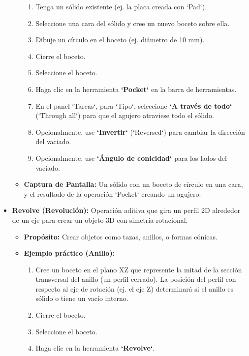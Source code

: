 \documentclass[12pt]{article}
\begin{document}
\begin{itemize}[label=\textbullet]
\begin{itemize}[label=\textendash]
        \begin{enumerate}[label=\arabic*)]
            \item Tenga un sólido existente (ej. la placa creada con `Pad`).
            \item Seleccione una cara del sólido y cree un nuevo boceto sobre ella.
            \item Dibuje un círculo en el boceto (ej. diámetro de 10 mm).
            \item Cierre el boceto.
            \item Seleccione el boceto.
            \item Haga clic en la herramienta \textbf{`Pocket`} en la barra de herramientas.
            \item En el panel `Tareas`, para `Tipo`, seleccione \textbf{`A través de todo`} (`Through all`) para que el agujero atraviese todo el sólido.
            \item Opcionalmente, use \textbf{`Invertir`} (`Reversed`) para cambiar la dirección del vaciado.
            \item Opcionalmente, use \textbf{`Ángulo de conicidad`} para los lados del vaciado.
        \end{enumerate}
        \item \textbf{Captura de Pantalla:} Un sólido con un boceto de círculo en una cara, y el resultado de la operación `Pocket` creando un agujero.
    \end{itemize}
    \item \textbf{Revolve (Revolución):} Operación aditiva que gira un perfil 2D alrededor de un eje para crear un objeto 3D con simetría rotacional.
    \begin{itemize}[label=\textendash]
        \item \textbf{Propósito:} Crear objetos como tazas, anillos, o formas cónicas.
        \item \textbf{Ejemplo práctico (Anillo):}
        \begin{enumerate}[label=\arabic*)]
            \item Cree un boceto en el plano XZ que represente la mitad de la sección transversal del anillo (un perfil cerrado). La posición del perfil con respecto al eje de rotación (ej. el eje Z) determinará si el anillo es sólido o tiene un vacío interno.
            \item Cierre el boceto.
            \item Seleccione el boceto.
            \item Haga clic en la herramienta \textbf{`Revolve`}.

\end{enumerate}
\end{itemize}
\end{itemize}
\end{document}
